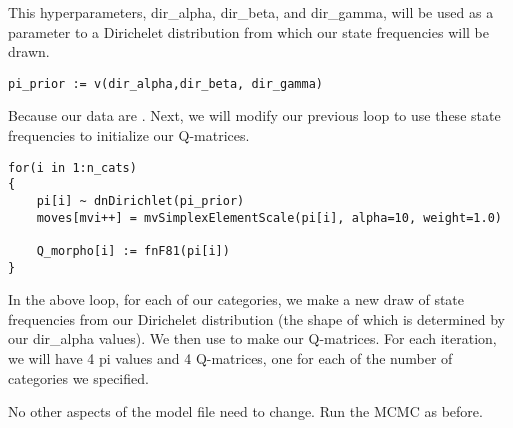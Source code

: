 This hyperparameters, dir\_alpha, dir\_beta, and dir\_gamma, will be used as a parameter to a Dirichelet distribution from which our state frequencies will be drawn.

{\tt \begin{snugshade*}
\begin{lstlisting}
pi_prior := v(dir_alpha,dir_beta, dir_gamma)
\end{lstlisting}
\end{snugshade*}}

Because our data are .
Next, we will modify our previous loop to use these state frequencies to initialize our Q-matrices.

{\tt \begin{snugshade*}
\begin{lstlisting}for(i in 1:n_cats)
{
	pi[i] ~ dnDirichlet(pi_prior)
    moves[mvi++] = mvSimplexElementScale(pi[i], alpha=10, weight=1.0) 
    
    Q_morpho[i] := fnF81(pi[i])
}
\end{lstlisting}
\end{snugshade*}}

In the above loop, for each of our categories, we make a new draw of state frequencies from our Dirichelet distribution (the shape of which is determined by our dir\_alpha values).  
We then use  to make our Q-matrices.
For each  iteration, we will have 4 pi values and 4 Q-matrices, one for each of the number of categories we specified. \par

No other aspects of the model file need to change.
Run the MCMC as before. \par
